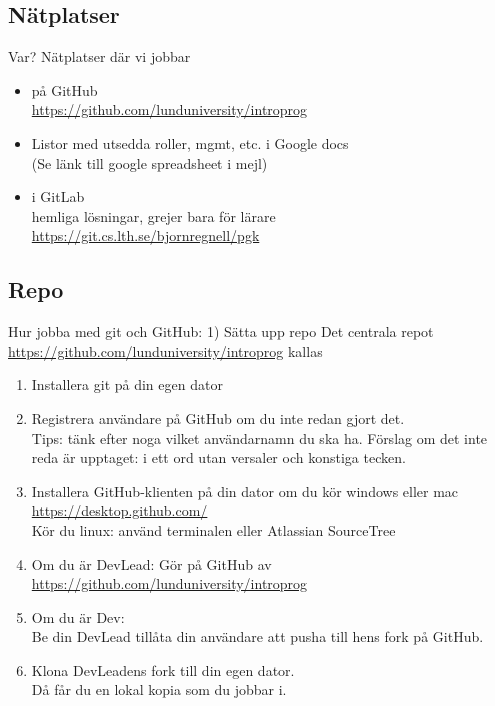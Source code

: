 \documentclass{slides}
\begin{document}
\subsection{Nätplatser}
\begin{Slide}{Var? Nätplatser där vi jobbar}
\begin{itemize}
\item {} på GitHub \\ \url{https://github.com/lunduniversity/introprog}
\item Listor med utsedda roller, mgmt, etc. i Google docs \\  
(Se länk till google spreadsheet i mejl)
\item {} i GitLab\\ hemliga lösningar, grejer bara för lärare \\ \url{https://git.cs.lth.se/bjornregnell/pgk}
\end{itemize}
\end{Slide}

\subsection{Repo}
\begin{Slide}{Hur jobba med git och GitHub: 1) Sätta upp repo}\footnotesize
Det centrala repot \url{https://github.com/lunduniversity/introprog} kallas 
\begin{enumerate}
\item Installera git på din egen dator
\item Registrera användare på GitHub om du inte redan gjort det. \\Tips: tänk efter noga vilket användarnamn du ska ha. Förslag om det inte reda är upptaget:  i ett ord utan versaler och konstiga tecken.
\item Installera GitHub-klienten på din dator om du kör windows eller mac \\ \url{https://desktop.github.com/} \\
Kör du linux: använd terminalen eller Atlassian SourceTree
\item Om du är DevLead: Gör  på GitHub av \url{https://github.com/lunduniversity/introprog}
\item Om du är Dev: \\Be din DevLead tillåta din användare att pusha till hens fork på GitHub.
\item Klona DevLeadens fork till din egen dator. \\Då får du en lokal kopia som du jobbar i.
\end{enumerate}
\end{Slide}
\end{document}
